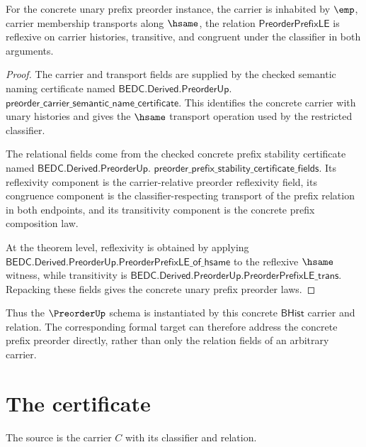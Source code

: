 \begin{theorem}
\label{thm:concrete-unary-prefix-preorder-laws}
For the concrete unary prefix preorder instance, the carrier is inhabited by
$\emp$, carrier membership transports along $\hsame$, the relation
$\mathsf{PreorderPrefixLE}$ is reflexive on carrier histories, transitive, and
congruent under the classifier in both arguments.
\end{theorem}
\begin{proof}
The carrier and transport fields are supplied by the checked semantic naming
certificate named $\mathsf{BEDC.Derived.PreorderUp.}$
$\mathsf{preorder\_carrier\_semantic\_name\_certificate}$.
This identifies the concrete carrier with unary histories and gives the
$\hsame$ transport operation used by the restricted classifier.

The relational fields come from the checked concrete prefix stability
certificate named $\mathsf{BEDC.Derived.PreorderUp.}$
$\mathsf{preorder\_prefix\_stability\_certificate\_fields}$.
Its reflexivity component is the carrier-relative preorder reflexivity field,
its congruence component is the classifier-respecting transport of the prefix
relation in both endpoints, and its transitivity component is the concrete
prefix composition law.

At the theorem level, reflexivity is obtained by applying
$\mathsf{BEDC.Derived.PreorderUp.PreorderPrefixLE\_of\_hsame}$ to the
reflexive $\hsame$ witness, while transitivity is
$\mathsf{BEDC.Derived.PreorderUp.PreorderPrefixLE\_trans}$. Repacking these
fields gives the concrete unary prefix preorder laws.
\end{proof}

Thus the $\PreorderUp$ schema is instantiated by this concrete $\mathsf{BHist}$
carrier and relation. The corresponding formal target can therefore address
the concrete prefix preorder directly, rather than only the relation fields of
an arbitrary carrier.





\section{The certificate}

\begin{definition}
\label{def:preorder-source-specification}
The source is the carrier \(C\) with its classifier and relation.
\end{definition}

